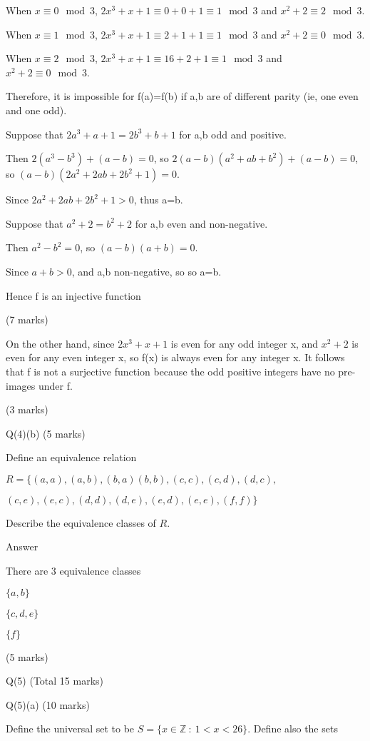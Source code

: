 \documentclass[a4paper,12pt,oneside]{book}
\theoremstyle{definition}
\begin{document}
When $x \equiv 0 \mod 3$, $2x^3 + x + 1 \equiv 0+0+1 \equiv 1 \mod 3$ and $x^2 + 2 \equiv 2 \mod 3$.

When $x \equiv 1 \mod 3$, $2x^3 + x + 1 \equiv 2+1+1 \equiv 1 \mod 3$ and $x^2 + 2 \equiv 0 \mod 3$.

When $x \equiv 2 \mod 3$, $2x^3 + x + 1 \equiv 16+2+1 \equiv 1 \mod 3$ and $x^2 + 2 \equiv 0 \mod 3$.

Therefore, it is impossible for f(a)=f(b) if a,b are of different parity (ie, one even and one odd).

Suppose that $2a^3 + a + 1 = 2b^3 + b + 1$ for a,b odd and positive. 

Then $2(a^3-b^3) + (a-b) = 0$, so $2(a-b)(a^2+ab+b^2) + (a-b) = 0$, so $(a-b)(2a^2+2ab+2b^2+1)=0$. 

Since $2a^2+2ab+2b^2+1 > 0$, thus a=b.

Suppose that $a^2 + 2 = b^2 + 2$ for a,b even and non-negative.

Then $a^2 - b^2 = 0$, so $(a-b)(a+b) = 0$.

Since $a+b > 0$, and a,b non-negative, so so a=b.

Hence f is an injective function

(7 marks)

On the other hand, since $2x^3 + x + 1$ is even for any odd integer x, and $x^2+2$ is even for any even integer x, so f(x) is always even for any integer x. It follows that f is not a surjective function because the odd positive integers have no pre-images under f.

(3 marks)

Q(4)(b) (5 marks)

Define an equivalence relation 

$R = \{ (a,a), (a,b), (b,a) (b,b), (c,c), (c,d), (d,c), $

$(c,e), (e,c), (d,d), (d,e), (e,d), (e,e), (f,f) \}$

Describe the equivalence classes of $R$.

Answer

There are 3 equivalence classes

$\{a,b\}$

$\{c,d,e\}$

$\{ f \}$

(5 marks)

\newpage

Q(5) (Total 15 marks)

Q(5)(a) (10 marks)

Define the universal set to be $S = \{ x \in \mathbb{Z} \ : \ 1 < x < 26 \}$. Define also the sets
\end{document}
